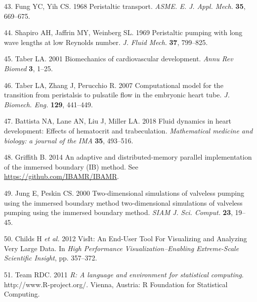 \documentclass[
]{article}
\begin{document}
\leavevmode\hypertarget{ref-Fung:68}{}%
43. Fung YC, Yih CS. 1968 Peristaltic transport. \emph{ASME. E. J. Appl.
Mech.} \textbf{35}, 669--675.

\leavevmode\hypertarget{ref-Shapiro:69}{}%
44. Shapiro AH, Jaffrin MY, Weinberg SL. 1969 Peristaltic pumping with
long wave lengths at low Reynolds number. \emph{J. Fluid Mech.}
\textbf{37}, 799--825.

\leavevmode\hypertarget{ref-Taber:2001}{}%
45. Taber LA. 2001 Biomechanics of cardiovascular development.
\emph{Annu Rev Biomed} \textbf{3}, 1--25.

\leavevmode\hypertarget{ref-Taber:2007}{}%
46. Taber LA, Zhang J, Perucchio R. 2007 Computational model for the
transition from peristalsis to pulsatile flow in the embryonic heart
tube. \emph{J. Biomech. Eng.} \textbf{129}, 441--449.

\leavevmode\hypertarget{ref-Battista:2018}{}%
47. Battista NA, Lane AN, Liu J, Miller LA. 2018 Fluid dynamics in heart
development: Effects of hematocrit and trabeculation. \emph{Mathematical
medicine and biology: a journal of the IMA} \textbf{35}, 493--516.

\leavevmode\hypertarget{ref-Griffith:2014}{}%
48. Griffith B. 2014 An adaptive and distributed-memory parallel
implementation of the immersed boundary (IB) method. See
\url{https://github.com/IBAMR/IBAMR}.

\leavevmode\hypertarget{ref-Jung:2000}{}%
49. Jung E, Peskin CS. 2000 Two-dimensional simulations of valveless
pumping using the immersed boundary method two-dimensional simulations
of valveless pumping using the immersed boundary method. \emph{SIAM J.
Sci. Comput.} \textbf{23}, 19--45.

\leavevmode\hypertarget{ref-HPV:VisIt}{}%
50. Childs H \emph{et al.} 2012 VisIt: An End-User Tool For Visualizing
and Analyzing Very Large Data. In \emph{High Performance
Visualization--Enabling Extreme-Scale Scientific Insight}, pp. 357--372.

\leavevmode\hypertarget{ref-R:2011}{}%
51. Team RDC. 2011 \emph{R: A language and environment for statistical
computing}. http://www.R-project.org/. Vienna, Austria: R Foundation for
Statistical Computing.
\end{document}
